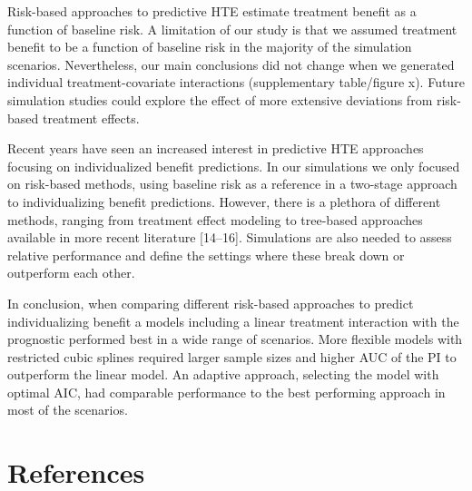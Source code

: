 \documentclass{article}
\begin{document}
Risk-based approaches to predictive HTE estimate treatment benefit as a
function of baseline risk. A limitation of our study is that we assumed
treatment benefit to be a function of baseline risk in the majority of
the simulation scenarios. Nevertheless, our main conclusions did not
change when we generated individual treatment-covariate interactions
(supplementary table/figure x). Future simulation studies could explore
the effect of more extensive deviations from risk-based treatment
effects.

Recent years have seen an increased interest in predictive HTE
approaches focusing on individualized benefit predictions. In our
simulations we only focused on risk-based methods, using baseline risk
as a reference in a two-stage approach to individualizing benefit
predictions. However, there is a plethora of different methods, ranging
from treatment effect modeling to tree-based approaches available in
more recent literature {[}14--16{]}. Simulations are also needed to
assess relative performance and define the settings where these break
down or outperform each other.

In conclusion, when comparing different risk-based approaches to predict
individualizing benefit a models including a linear treatment
interaction with the prognostic performed best in a wide range of
scenarios. More flexible models with restricted cubic splines required
larger sample sizes and higher AUC of the PI to outperform the linear
model. An adaptive approach, selecting the model with optimal AIC, had
comparable performance to the best performing approach in most of the
scenarios.

\newpage

\hypertarget{references}{%
\section{References}\label{references}}

\nolinenumbers
\setlength{\parindent}{-0.25in}
\setlength{\leftskip}{0.25in}

\noindent
\end{document}
